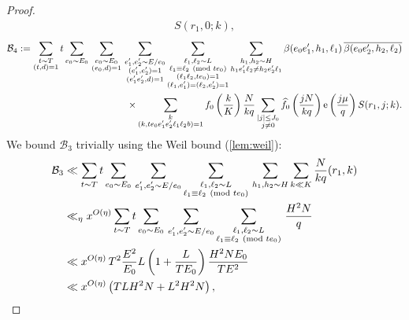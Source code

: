 \documentclass[reqno,11pt]{amsart}
\theoremstyle{definition}
\theoremstyle{remark}
\numberwithin{equation}{section}
\newcommand{\mB}{\mathcal{B}}
\newcommand{\e}{\textnormal{e}}
\renewcommand{\bar}{\overline}
\renewcommand{\hat}{\widehat}
\renewcommand{\pmod}[1]{\ (\textnormal{mod } #1)}
\begin{document}
\begin{proof}
\[\begin{aligned}
    S(r_1, 0; k),
\end{aligned}
\]
\[
\begin{aligned}
    \mB_4 := 
    \sum_{\substack{t \sim T \\ (t, d) = 1}} t \sum_{e_0 \sim E_0}\,
    \sum_{\substack{e_0 \sim E_0 \\ (e_0, d) = 1}}\, 
    \sum_{\substack{e_1', e_2' \sim E/e_0 \\ (e_1', e_2') = 1 \\ (e_1' e_2', d) = 1}}
    \sum_{\substack{\ell_1, \ell_2 \sim L \\ \ell_1 \equiv \ell_2 \pmod{te_0} \\ (\ell_1 \ell_2, te_0) = 1 \\ (\ell_1, e_1') = (\ell_2, e_2') = 1}}
    \sum_{\substack{h_1, h_2 \sim H \\ h_1e_1'\ell_2 \neq h_2e_2'\ell_1}} \beta(e_0e_1', h_1, \ell_1) \, \bar{\beta(e_0e_2', h_2, \ell_2)} 
    \\
    \qquad\qquad \times 
    \sum_{\substack{k \\ (k, te_0e_1'e_2'\ell_1\ell_2b) = 1}} 
    f_0\left(\frac{k}{K}\right)
    \frac{N}{kq} \sum_{\substack{|j| \le J_0 \\ j \neq 0}} \hat{f_0}\left(\frac{jN}{kq}\right) \e\left(\frac{j\mu}{q}\right)
    S(r_1, j; k).
\end{aligned}
\]
We bound $\mB_3$ trivially using the Weil bound (\cref{lem:weil}):
\begin{equation} \label{eq:b3-estimate}
\begin{aligned}
    \mB_3 &\ll 
    \sum_{t \sim T} t \sum_{e_0 \sim E_0}\,
    \sum_{\substack{e_1', e_2' \sim E/e_0}}
    \sum_{\substack{\ell_1, \ell_2 \sim L \\ \ell_1 \equiv \ell_2 \pmod{te_0}}}\,
    \sum_{\substack{h_1, h_2 \sim H}}
    \sum_{k \ll K} 
    \frac{N}{kq}
    (r_1, k)
    \\
    &\ll_\eta x^{O(\eta)} 
    \sum_{t \sim T} t \sum_{e_0 \sim E_0}\,
    \sum_{\substack{e_1', e_2' \sim E/e_0}}
    \sum_{\substack{\ell_1, \ell_2 \sim L \\ \ell_1 \equiv \ell_2 \pmod{te_0}}}\,
    \frac{H^2N}{q}
    \\
    &\ll 
    x^{O(\eta)}\, 
    T^2 \frac{E^2}{E_0}
    L\left(1 + \frac{L}{TE_0}\right)
    \frac{H^2NE_0}{TE^2}
    \\
    &\ll 
    x^{O(\eta)} \left(TLH^2N + L^2H^2N \right),
\end{aligned}
\end{equation}

\end{proof}
\end{document}
